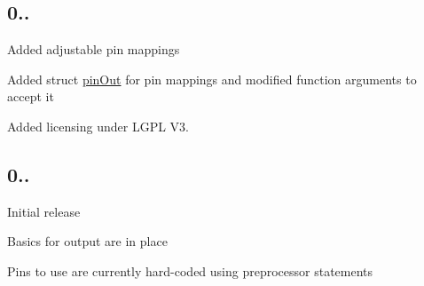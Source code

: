 \subsection*{0..}


\begin{DoxyItemize}
\item Added adjustable pin mappings
\item Added struct {\ttfamily \hyperlink{structpin_out}{pin\+Out}} for pin mappings and modified function arguments to accept it
\item Added licensing under L\+G\+P\+L V3.
\end{DoxyItemize}

\subsection*{0..}


\begin{DoxyItemize}
\item Initial release
\item Basics for output are in place
\item Pins to use are currently hard-\/coded using preprocessor statements 
\end{DoxyItemize}